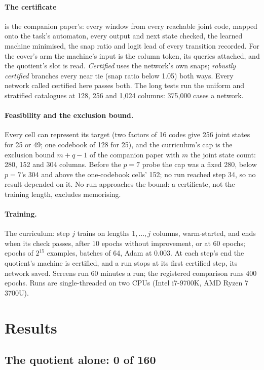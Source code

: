 \documentclass[11pt]{article}
\begin{document}
\paragraph{The certificate} is the companion paper's: every window from every reachable joint
code, mapped onto the task's automaton, every output and next state checked, the learned machine
minimised, the snap ratio and logit lead of every transition recorded. For the cover's arm the machine's
input is the column token, its queries attached, and the quotient's slot is read. \emph{Certified}
uses the network's own snaps; \emph{robustly certified} branches every near tie (snap ratio below
1.05) both ways. Every network called certified here passes both. The long tests run the uniform
and stratified catalogues at 128, 256 and 1{,}024 columns: 375{,}000 cases a network.

\paragraph{Feasibility and the exclusion bound.} Every cell can represent its target (two factors
of 16 codes give 256 joint states for 25 or 49; one codebook of 128 for 25), and the curriculum's
cap is the exclusion bound $m + q - 1$ of the companion paper with $m$ the joint state count: 280,
152 and 304 columns. Before the $p = 7$ probe the cap was a fixed 280, below $p = 7$'s 304 and above
the one-codebook cells' 152; no run reached step 34, so no result depended on it. No run approaches
the bound: a certificate, not the training length, excludes memorising.

\paragraph{Training.} The curriculum: step $j$ trains on lengths $1, \dots, j$ columns, warm-started,
and ends when its check passes, after 10 epochs without improvement, or at 60 epochs; epochs of
$2^{15}$ examples, batches of 64, Adam at 0.003. At each step's end the quotient's machine is
certified, and a run stops at its first certified step, its network saved. Screens run 60 minutes a
run; the registered comparison runs 400 epochs. Runs are single-threaded on two CPUs (Intel
i7-9700K, AMD Ryzen 7 3700U).

\section{Results}

\subsection{The quotient alone: 0 of 160}
\label{sec:failures}
\end{document}
